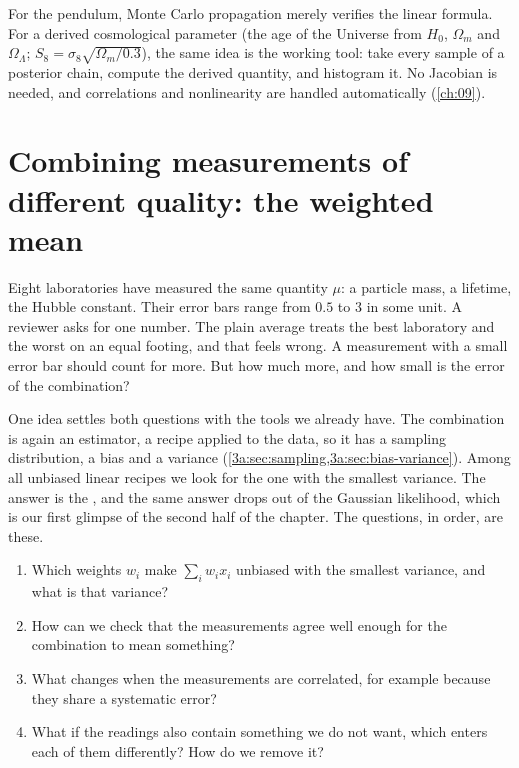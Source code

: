 \begin{inpractice}
For the pendulum, Monte Carlo propagation merely verifies the linear formula.
For a derived cosmological parameter (the age of the Universe from $H_0$,
$\Omega_m$ and $\Omega_\Lambda$; $S_8=\sigma_8\sqrt{\Omega_m/0.3}$), the same idea
is the working tool: take every sample of a posterior chain, compute the
derived quantity, and histogram it. No Jacobian is needed, and correlations
and nonlinearity are handled automatically (\cref{ch:09}).
\end{inpractice}

\section{Combining measurements of different quality: the weighted mean}
\label{3a:sec:weighted}

Eight laboratories have measured the same quantity $\mu$: a particle mass, a
lifetime, the Hubble constant. Their error bars range from $0.5$ to $3$ in
some unit. A reviewer asks for one number. The plain average treats the best
laboratory and the worst on an equal footing, and that feels wrong. A
measurement with a small error bar should count for more. But how much more,
and how small is the error of the combination?

One idea settles both questions with the tools we already
have. The combination is again an estimator, a recipe applied to the data,
so it has a sampling distribution, a bias and a variance
(\cref{3a:sec:sampling,3a:sec:bias-variance}). Among all unbiased linear
recipes we look for the one with the smallest variance. The answer is the
, and the same answer drops out of
the Gaussian likelihood, which is our first glimpse of the second half of
the chapter. The questions, in order, are these.
\begin{enumerate}[label=\arabic*.]
  \item Which weights $w_i$ make $\sum_i w_ix_i$ unbiased with the smallest
        variance, and what is that variance?
  \item How can we check that the measurements agree well enough for the
        combination to mean something?
  \item What changes when the measurements are correlated, for example
        because they share a systematic error?
  \item What if the readings also contain something we do not want, which
        enters each of them differently? How do we remove it?
\end{enumerate}

